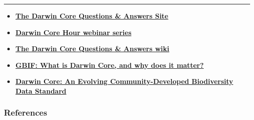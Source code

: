 \documentclass[]{book}
\theoremstyle{definition}
\theoremstyle{definition}
\theoremstyle{definition}
\theoremstyle{remark}
\begin{document}
\begin{center}\rule{0.5\linewidth}{\linethickness}\end{center}

\begin{itemize}
\item
  \textbf{\href{https://github.com/tdwg/dwc-qa\%20target=\%22_blank\%22}{The
  Darwin Core Questions \& Answers Site}}
\item
  \textbf{\href{https://github.com/tdwg/dwc-qa/wiki/Webinars\%20target=\%22_blank\%22}{Darwin
  Core Hour webinar series}}
\item
  \textbf{\href{https://github.com/tdwg/dwc-qa/wiki\%20target=\%22_blank\%22}{The
  Darwin Core Questions \& Answers wiki}}
\item
  \textbf{\href{https://www.gbif.org/darwin-core\%20target=\%22_blank\%22}{GBIF:
  What is Darwin Core, and why does it matter?}}
\item
  \textbf{\href{https://doi.org/10.1371/journal.pone.0029715\%20target=\%22_blank\%22}{Darwin
  Core: An Evolving Community-Developed Biodiversity Data Standard}
  \citep{DwC-paper} }
\end{itemize}

\subsubsection*{References}\label{references-1}


\end{document}
